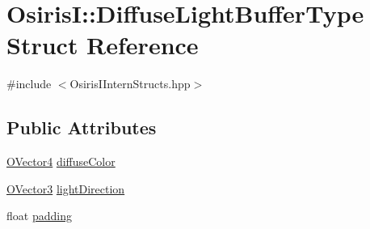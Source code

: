 \hypertarget{struct_osiris_i_1_1_diffuse_light_buffer_type}{\section{Osiris\-I\-:\-:Diffuse\-Light\-Buffer\-Type Struct Reference}
\label{struct_osiris_i_1_1_diffuse_light_buffer_type}
}


{\ttfamily \#include $<$Osiris\-I\-Intern\-Structs.\-hpp$>$}

\subsection*{Public Attributes}
\begin{DoxyCompactItemize}
\item 
\hyperlink{struct_osiris_i_1_1_o_vector4}{O\-Vector4} \hyperlink{struct_osiris_i_1_1_diffuse_light_buffer_type_a7be9ffd12a512b06196cae9225889886}{diffuse\-Color}
\item 
\hyperlink{struct_osiris_i_1_1_o_vector3}{O\-Vector3} \hyperlink{struct_osiris_i_1_1_diffuse_light_buffer_type_a5b065d94c163ea68510f8b2c1f93144e}{light\-Direction}
\item 
float \hyperlink{struct_osiris_i_1_1_diffuse_light_buffer_type_a8dfd780889813b335b7ef9cf8ec9227a}{padding}
\end{DoxyCompactItemize}


